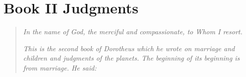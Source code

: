 \chapter{Book II Judgments}
\begin{quote}
\textsl{In the name of God, the merciful and compassionate, to Whom I resort.}

\textsl{This is the second book of Dorotheus which he wrote on marriage and children and judgments of the planets. The beginning of its beginning is from marriage. He said:}
\end{quote}











